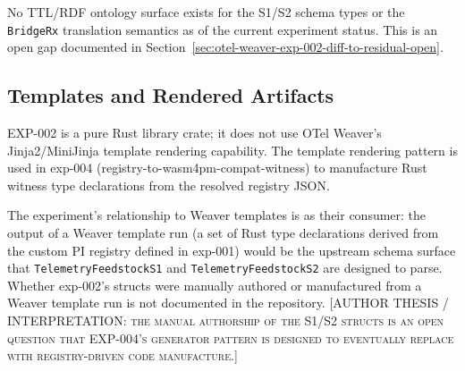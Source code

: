 No TTL/RDF ontology surface exists for the S1/S2 schema types or the
\texttt{BridgeRx} translation semantics as of the current experiment status. This
is an open gap documented in
Section~\ref{sec:otel-weaver-exp-002-diff-to-residual-open}.

\subsection{Templates and Rendered Artifacts}
\label{sec:otel-weaver-exp-002-diff-to-residual-impl-templates}

EXP-002 is a pure Rust library crate; it does not use OTel Weaver's Jinja2/MiniJinja
template rendering capability. The template rendering pattern is used in exp-004
(registry-to-wasm4pm-compat-witness) to manufacture Rust witness type declarations
from the resolved registry JSON.

The experiment's relationship to Weaver templates is as their consumer: the output
of a Weaver template run (a set of Rust type declarations derived from the custom
PI registry defined in exp-001) would be the upstream schema surface that
\texttt{TelemetryFeedstockS1} and \texttt{TelemetryFeedstockS2} are designed to
parse. Whether exp-002's structs were manually authored or manufactured from a
Weaver template run is not documented in the repository.
\textsc{[AUTHOR THESIS / INTERPRETATION: the manual authorship of the S1/S2 structs
is an open question that EXP-004's generator pattern is designed to eventually
replace with registry-driven code manufacture.]}
